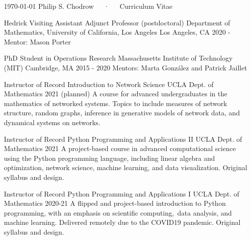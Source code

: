 \documentclass[11pt, letterpaper]{awesome-cv}
\begin{document}
\nobibliography*


\makecvheader

\makecvfooter
  {\today}
  {Philip S. Chodrow~~~·~~~Curriculum Vitae}
  {\thepage}




\begin{cventries}

\cventry
  {Hedrick Visiting Assistant Adjunct Professor (postdoctoral)} %
  {Department of Mathematics, University of California, Los Angeles} %
  {Los Angeles, CA} %
  {2020 - } %
  {Mentor: Mason Porter}

\cventry
    {PhD Student in Operations Research} %
    {Massachusetts Institute of Technology (MIT)} %
    {Cambridge, MA} %
    {2015 - 2020} %
    {Mentors: Marta Gonz\'{a}lez and Patrick Jaillet}

\end{cventries}


\begin{cventries}

  \cventry
    {Instructor of Record}
    {Introduction to Network Science}
    {UCLA Dept. of Mathematics}
    {2021 (planned)}
    {A course for advanced undergraduates in the mathematics of networked systems. Topics to include measures of network structure, random graphs, inference in generative models of network data, and dynamical systems on networks.}

  \cventry
    {Instructor of Record}
    {Python Programming and Applications II}
    {UCLA Dept. of Mathematics}
    {2021}
    {A project-based course in advanced computational science using the Python programming language, including linear algebra and optimization, network science, machine learning, and data visualization.
    Original syllabus and design.}

  \cventry
    {Instructor of Record}
    {Python Programming and Applications I}
    {UCLA Dept. of Mathematics}
    {2020-21}
    {A flipped and project-based introduction to Python programming, with an emphasis on scientific computing, data analysis, and machine learning. Delivered remotely due to the COVID19 pandemic. 
    Original syllabus and design.}
\end{cventries}
\end{document}
